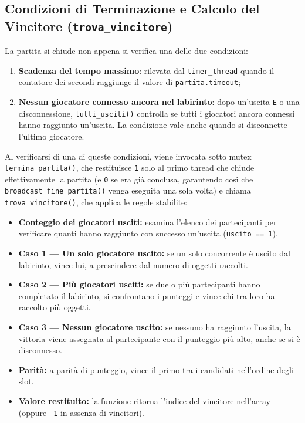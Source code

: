 \documentclass[11pt,a4paper]{article}
\begin{document}
\clearpage

\subsection{Condizioni di Terminazione e Calcolo del Vincitore (\texttt{trova\_vincitore})}

La partita si chiude non appena si verifica una delle due condizioni:
\begin{enumerate}
    \item \textbf{Scadenza del tempo massimo}: rilevata dal \texttt{timer\_thread} quando il contatore dei secondi raggiunge il valore di \texttt{partita.timeout};
    \item \textbf{Nessun giocatore connesso ancora nel labirinto}: dopo un'uscita \texttt{E} o una disconnessione, \texttt{tutti\_usciti()} controlla se tutti i giocatori ancora connessi hanno raggiunto un'uscita. La condizione vale anche quando si disconnette l'ultimo giocatore.
\end{enumerate}

Al verificarsi di una di queste condizioni, viene invocata sotto mutex \texttt{termina\_partita()}, che restituisce \texttt{1} solo al primo thread che chiude effettivamente la partita (e \texttt{0} se era già conclusa, garantendo così che \texttt{broadcast\_fine\_partita()} venga eseguita una sola volta) e chiama \texttt{trova\_vincitore()}, che applica le regole stabilite:

\begin{itemize}[leftmargin=*]
    \item \textbf{Conteggio dei giocatori usciti:} esamina l'elenco dei partecipanti per verificare quanti hanno raggiunto con successo un'uscita (\texttt{uscito == 1}).
    \item \textbf{Caso 1 --- Un solo giocatore uscito:} se un solo concorrente è uscito dal labirinto, vince lui, a prescindere dal numero di oggetti raccolti.
    \item \textbf{Caso 2 --- Più giocatori usciti:} se due o più partecipanti hanno completato il labirinto, si confrontano i punteggi e vince chi tra loro ha raccolto più oggetti.
    \item \textbf{Caso 3 --- Nessun giocatore uscito:} se nessuno ha raggiunto l'uscita, la vittoria viene assegnata al partecipante con il punteggio più alto, anche se si è disconnesso.
    \item \textbf{Parità:} a parità di punteggio, vince il primo tra i candidati nell'ordine degli slot.
    \item \textbf{Valore restituito:} la funzione ritorna l'indice del vincitore nell'array (oppure \texttt{-1} in assenza di vincitori).
\end{itemize}
\end{document}
